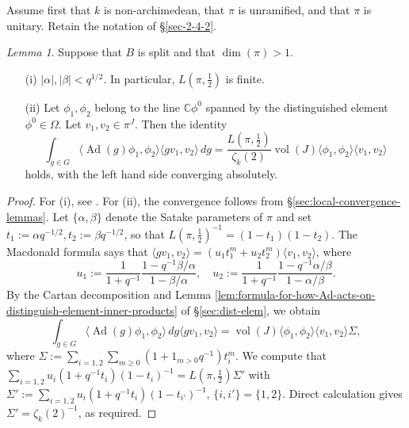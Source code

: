 \documentclass[reqno,10pt]{amsart}
\theoremstyle{plain} %
\theoremstyle{definition}
\theoremstyle{plain} %
\theoremstyle{remark}
\theoremstyle{itplain} %
\newtheorem{lemma}{Lemma}
\theoremstyle{remark} %
\renewcommand{\geq}{\geqslant}
\numberwithin{equation}{section}
\DeclareMathOperator{\Ad}{Ad}
\DeclareMathOperator{\vol}{vol}
\begin{document}
Assume first that $k$ is non-archimedean, that $\pi$ is unramified, and that $\pi$ is unitary.
Retain the notation of \S\ref{sec-2-4-2}.
\begin{lemma}\label{lem:local-rallis-ipf-unram-calc}
  Suppose that $B$ is split and that $\dim(\pi) > 1$.
  \begin{enumerate}
  \item[(i)] $|\alpha|, |\beta| < q^{1/2}$.  In particular, $L(\pi,\tfrac{1}{2})$ is finite.
  \item[(ii)] Let $\phi_1, \phi_2$ belong to the line $\mathbb{C} \phi^0$ spanned by the distinguished element $\phi^0 \in \Omega$.  Let $v_1, v_2 \in \pi^J$.  Then the identity
    \begin{equation}\label{eqn:local-rallis-ipf-unram-calc}
      \int_{g \in G}
      \langle \Ad(g) \phi_1, \phi_2 \rangle
      \langle g v_1, v_2 \rangle \,d g 
      =
      \frac{L(\pi,\frac{1}{2})}{\zeta_k(2)}
      \vol(J) %
      \langle \phi_1, \phi_2 \rangle
      \langle v_1, v_2 \rangle
    \end{equation}
    holds, with the left hand side converging absolutely.
  \end{enumerate}
\end{lemma}
\begin{proof}
  For (i), see \cite[Thm 4.6.7]{MR1431508}.  For (ii), the convergence follows from \S\ref{sec:local-convergence-lemmas}.
  Let $\{\alpha,\beta\}$ denote the Satake parameters of $\pi$ and set $t_1 := \alpha q^{-1/2}, t_2 := \beta q^{-1/2}$, so that $L(\pi,\tfrac{1}{2})^{-1} = (1 - t_1) (1-t_2)$.  The Macdonald formula \cite[Thm 4.6.6]{MR1431508} says that $\langle g v_1, v_2 \rangle = (u_1 t_1^m + u_2 t_2^m) \langle v_1, v_2 \rangle$, where
  \[
    u_1 := \frac{1}{1 + q^{-1}}\frac{1 - q^{-1} \beta/\alpha }{1 - \beta / \alpha }, \quad u_2 := \frac{1}{1 + q^{-1}}\frac{1 - q^{-1} \alpha / \beta }{1 - \alpha / \beta }.
  \]
  By the Cartan decomposition and Lemma \ref{lem:formula-for-how-Ad-acts-on-distinguish-element-inner-products} of \S\ref{sec:dist-elem}, we obtain
  \begin{equation*}
  \int_{g \in G} \langle \Ad(g) \phi_1, \phi_2 \rangle \,d g 
    \langle g v_1, v_2 \rangle = \vol(J) %
    \langle \phi_1, \phi_2 \rangle \langle v_1, v_2 \rangle \Sigma,
  \end{equation*}
  where $\Sigma := \sum_{i=1,2} \sum_{m \geq 0} (1 + 1_{m>0} q^{-1}) t_i^m$.  We compute that $\sum_{i=1,2} u_i (1 + q^{-1} t_i) ( 1 - t_i)^{-1} = L(\pi,\tfrac{1}{2}) \Sigma '$ with $\Sigma ' := \sum_{i=1,2} u_i (1 + q^{-1} t_i) ( 1 - t_{i'})^{-1}$, $\{i, i'\} = \{1,2\}$.  Direct calculation gives $\Sigma ' = \zeta_k(2)^{-1}$, as required.
\end{proof}
\end{document}
